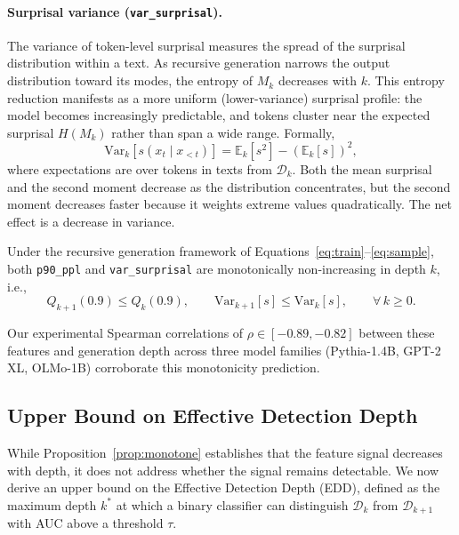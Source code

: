 \paragraph{Surprisal variance (\texttt{var\_surprisal}).}
The variance of token-level surprisal measures the spread of the surprisal distribution within a text. As recursive generation narrows the output distribution toward its modes, the entropy of $M_k$ decreases with $k$. This entropy reduction manifests as a more uniform (lower-variance) surprisal profile: the model becomes increasingly predictable, and tokens cluster near the expected surprisal $H(M_k)$ rather than span a wide range. Formally,
\begin{equation}
    \text{Var}_k[s(x_t \mid x_{<t})] = \mathbb{E}_k[s^2] - (\mathbb{E}_k[s])^2,
    \label{eq:var_surprisal}
\end{equation}
where expectations are over tokens in texts from $\mathcal{D}_k$. Both the mean surprisal and the second moment decrease as the distribution concentrates, but the second moment decreases faster because it weights extreme values quadratically. The net effect is a decrease in variance.

\begin{proposition}
\label{prop:monotone}
Under the recursive generation framework of Equations~\eqref{eq:train}--\eqref{eq:sample}, both \texttt{p90\_ppl} and \texttt{var\_surprisal} are monotonically non-increasing in depth $k$, i.e.,
\begin{equation}
    Q_{k+1}(0.9) \leq Q_k(0.9), \qquad \text{Var}_{k+1}[s] \leq \text{Var}_k[s], \qquad \forall\, k \geq 0.
\end{equation}
\end{proposition}

Our experimental Spearman correlations of $\rho \in [-0.89, -0.82]$ between these features and generation depth across three model families (Pythia-1.4B, GPT-2 XL, OLMo-1B) corroborate this monotonicity prediction.

\subsection{Upper Bound on Effective Detection Depth}
\label{sec:theory:edd}

While Proposition~\ref{prop:monotone} establishes that the feature signal decreases with depth, it does not address whether the signal remains detectable. We now derive an upper bound on the Effective Detection Depth (EDD), defined as the maximum depth $k^*$ at which a binary classifier can distinguish $\mathcal{D}_k$ from $\mathcal{D}_{k+1}$ with AUC above a threshold $\tau$.

